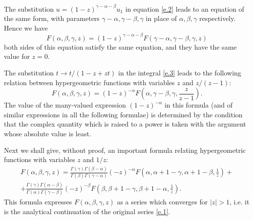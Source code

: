 The substitution $ u = (1 - z)^{\gamma-\alpha-\beta}u_1 $ in equation \eqref{e.2} leads to an equation of the same form, with parameters $ \gamma-\alpha, \gamma-\beta, \gamma $ in place of $ \alpha, \beta, \gamma $ respectively. Hence we have
\begin{equation}\label{e.4}
F(\alpha,\beta,\gamma,z)=(1-z)^{\gamma-\alpha-\beta}F(\gamma-\alpha,\gamma-\beta,\gamma,z)
\end{equation}
both sides of this equation satisfy the same equation, and they have the same value for $ z = 0 $.

The substitution $ t \to t/(1 - z + zt) $ in the integral \eqref{e.3} leads to the following relation between hypergeometric functions with variables $ z $ and $ z/(z − 1) $:
\begin{equation}\label{e.5}
F(\alpha,\beta,\gamma,z)=(1-z)^{-\alpha}F\left(\alpha,\gamma-\beta,\gamma,\frac{z}{z-1}\right).
\end{equation}
The value of the many-valued expression $ (1 - z)^{-\alpha} $ in this formula (and of similar expressions in all the following formulae) is determined by the condition that the complex quantity which is raised to a power is taken with the argument whose absolute value is least.

Next we shall give, without proof, an important formula relating hypergeometric functions with variables $ z $ and $ 1/z $:
\begin{multline}\label{e.6}
F(\alpha,\beta,\gamma,z)=\frac{\Gamma(\gamma)\Gamma(\beta-\alpha)}{\Gamma(\beta)\Gamma(\gamma-\alpha)}(-z)^{-\alpha}F\left(\alpha,\alpha+1-\gamma,\alpha+1-\beta,\frac{1}{z}\right)+\\
+\frac{\Gamma(\gamma)\Gamma(\alpha-\beta)}{\Gamma(\alpha)\Gamma(\gamma-\beta)}(-z)^{-\beta}F\left(\beta,\beta+1-\gamma,\beta+1-\alpha,\frac{1}{z} \right).
\end{multline}
This formula expresses $ F (\alpha, \beta, \gamma, z) $ as a series which converges for $ |z| > 1 $, i.e. it is the analytical continuation of the original series \eqref{e.1}.

